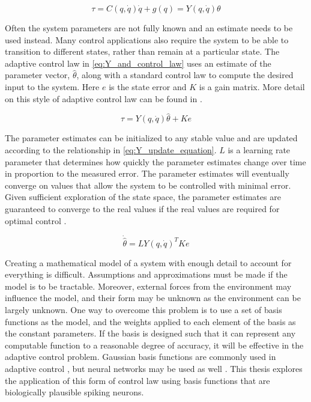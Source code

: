 \documentclass[letterpaper,12pt,titlepage,oneside,final]{book}
\begin{document}
\begin{equation} \label{eq:Y_equation}
\tau = C(q,\dot{q})\dot{q} + g(q) = Y(q,\dot{q})\theta
\end{equation}

Often the system parameters are not fully known and an estimate needs to be used instead.
Many control applications also require the system to be able to transition to different states, rather than remain at a particular state.
The adaptive control law in \eqref{eq:Y_and_control_law} uses an estimate of the parameter vector, $\hat{\theta}$, along with a standard control law to compute the desired input to the system. Here $e$ is the state error and $K$ is a gain matrix.
More detail on this style of adaptive control law can be found in \cite{slotine1987adaptive, slotine1991applied, cheah2006adaptive}.

\begin{equation} \label{eq:Y_and_control_law}
\tau = Y(q,\dot{q})\hat{\theta} + Ke
\end{equation}

The parameter estimates can be initialized to any stable value and are updated according to the relationship in \eqref{eq:Y_update_equation}.
$L$ is a learning rate parameter that determines how quickly the parameter estimates change over time in proportion to the measured error.
The parameter estimates will eventually converge on values that allow the system to be controlled with minimal error.
Given sufficient exploration of the state space, the parameter estimates are guaranteed to converge to the real values if the real values are required for optimal control \cite{slotine1987adaptive}.

\begin{equation} \label{eq:Y_update_equation}
\dot{\hat{\theta}} = LY(q,\dot{q})^{T}Ke
\end{equation}


Creating a mathematical model of a system with enough detail to account for everything is difficult. 
Assumptions and approximations must be made if the model is to be tractable. 
Moreover, external forces from the environment may influence the model, and their form may be unknown as the environment can be largely unknown. 
One way to overcome this problem is to use a set of basis functions as the model, and the weights applied to each element of the basis as the constant parameters. 
If the basis is designed such that it can represent any computable function to a reasonable degree of accuracy, it will be effective in the adaptive control problem. 
Gaussian basis functions are commonly used in adaptive control \cite{sanner1992gaussian}, but neural networks may be used as well \cite{barto1983neuronlike}.
This thesis explores the application of this form of control law using basis functions that are biologically plausible spiking neurons.
\end{document}
